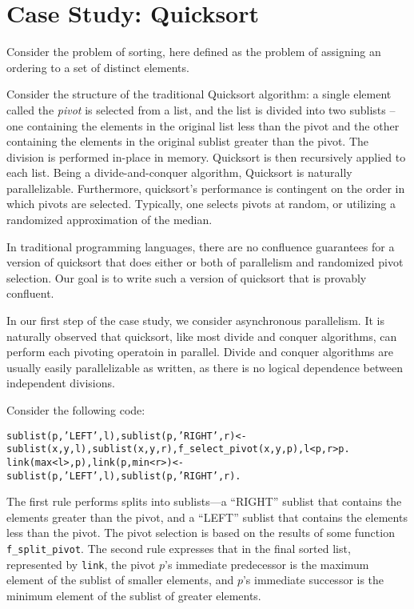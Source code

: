 \section{Case Study: Quicksort}
\label{sec:qscs}


Consider the problem of sorting, here defined as the problem of assigning an ordering to a set of distinct elements.

Consider the structure of the traditional Quicksort algorithm: a single element called the {\em pivot} is selected from a list, and the list is divided into two sublists -- one containing the elements in the original list less than the pivot and the other containing the elements in the original sublist greater than the pivot.  The division is performed in-place in memory.  Quicksort is then recursively applied to each list.  Being a divide-and-conquer algorithm, Quicksort is naturally parallelizable.  Furthermore, quicksort's performance is contingent on the order in which pivots are selected.  Typically, one selects pivots at random, or utilizing a randomized approximation of the median.

In traditional programming languages, there are no confluence guarantees for a version of quicksort that does either or both of parallelism and randomized pivot selection.  Our goal is to write such a version of quicksort that is provably confluent.

In our first step of the case study, we consider asynchronous parallelism.  It is naturally observed that quicksort, like most divide and conquer algorithms, can perform each pivoting operatoin in parallel.  Divide and conquer algorithms are usually easily parallelizable as written, as there is no logical dependence between independent divisions.

Consider the following code:

\begin{alltt}
sublist(p,'LEFT',l), sublist(p,'RIGHT',r) <- sublist(x,y,l), sublist(x,y,r), f_select_pivot(x,y,p), l < p, r > p.
link(max<l>,p), link(p,min<r>) <- sublist(p,'LEFT',l), sublist(p,'RIGHT',r).
\end{alltt}

The first rule performs splits into sublists---a ``RIGHT'' sublist that contains the elements greater than the pivot, and a ``LEFT'' sublist that contains the elements less than the pivot.  The pivot selection is based on the results of some function {\tt f\_split\_pivot}.  The second rule expresses that in the final sorted list, represented by {\tt link}, the pivot $p$'s immediate predecessor is the maximum element of the sublist of smaller elements, and $p$'s immediate successor is the minimum element of the sublist of greater elements.

